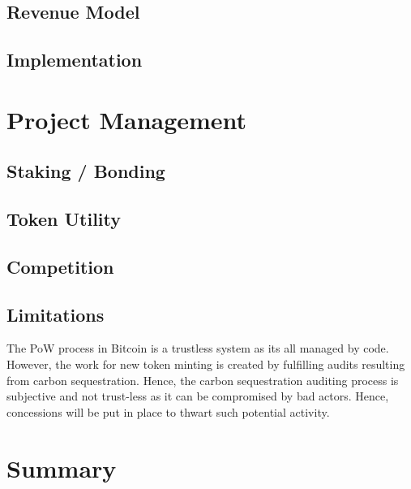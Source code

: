 \documentclass{article}
\begin{document}
\lipsum[1-1]

\subsection{Revenue Model}

\lipsum[1-1]


\subsection{Implementation}

\lipsum[1-1]

\section{Project Management}

\subsection{Staking / Bonding}

\lipsum[1-1]

\subsection{Token Utility}

\lipsum[1-1]


\subsection{Competition}

\lipsum[1-1]

\subsection{Limitations}

The PoW process in Bitcoin is a trustless system as its all managed by code. However, the work for new token minting is created by fulfilling audits resulting from carbon sequestration. Hence, the carbon sequestration auditing process is subjective and not trust-less as it can be compromised by bad actors. Hence, concessions will be put in place to thwart such potential activity.

\section{Summary}

\lipsum[1-1]
\end{document}
